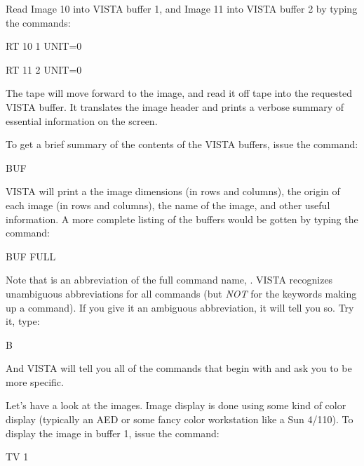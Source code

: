 {Read Image 10 into VISTA buffer 1, and Image 11 into VISTA buffer 2 by
typing the commands:

\begin{command}
      \item RT 10 1 UNIT=0
      \item RT 11 2 UNIT=0
\end{command}

The tape will move forward to the image, and read it off tape into the
requested VISTA buffer.  It translates the image header and prints a verbose
summary of essential information on the screen.

To get a brief summary of the contents of the VISTA buffers, issue the
command:

\begin{command}
      \item BUF
\end{command}

\noindent
VISTA will print a the image dimensions (in rows and columns), the origin of
each image (in rows and columns), the name of the image, and other useful
information.  A more complete listing of the buffers would be gotten by typing
the command:

\begin{command}
      \item BUF FULL
\end{command}

Note that  is an abbreviation of the full command name,
.  VISTA recognizes unambiguous abbreviations for all commands
(but {\it NOT} for the keywords making up a command).  If you give it an
ambiguous abbreviation, it will tell you so.  Try it, type:

\begin{command}
      \item B
\end{command}

\noindent
And VISTA will tell you all of the commands that begin with  and ask
you to be more specific.

\medskip

\nobreak
Let's have a look at the images.  Image display is done using some kind of
color display (typically an AED or some fancy color workstation like a Sun
4/110).  To display the image in buffer 1, issue the command:

\begin{command}
      \item TV 1
\end{command}

}
